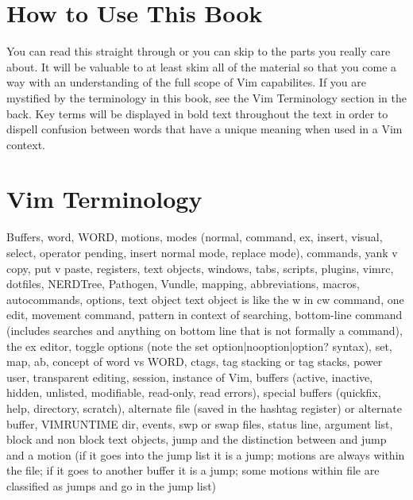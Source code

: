 \documentclass[12pt]{book}
\begin{document}
\section{How to Use This Book}
You can read this straight through or you can skip to the parts you really care about.
It will be valuable to at least skim all of the material so that you come a way with an understanding of the full scope of Vim capabilites.
If you are mystified by the terminology in this book, see the Vim Terminology section in the back.
Key terms will be displayed in bold text throughout the text in order to dispell confusion between words that have a unique meaning when used in a Vim context.

\section{Vim Terminology}
Buffers, word, WORD, motions, modes (normal, command, ex, insert, visual, select, operator pending, insert normal mode, replace mode), commands, yank v copy, put v paste, registers, text objects, windows, tabs, scripts, plugins, vimrc, dotfiles,
NERDTree, Pathogen, Vundle, mapping, abbreviations, macros, autocommands, options, text object text object is like the w in cw command, one edit, movement command, pattern in context of
searching, bottom-line command (includes searches and anything on bottom line that is not formally a command), the ex editor, toggle options (note the set option|nooption|option? syntax),
set, map, ab, concept of word vs WORD, ctags, tag stacking or tag stacks, power user, transparent editing, session, instance of Vim, buffers (active, inactive, hidden, unlisted, modifiable, read-only,
read errors), special buffers (quickfix, help, directory, scratch), alternate file (saved in the hashtag register) or alternate buffer, VIMRUNTIME dir, events, swp or swap files, status line,
argument list, block and non block text objects, jump and the distinction between and jump and a motion (if it goes into the jump list it is a jump; motions are always within the file; if it goes to
another buffer it is a jump; some motions within file are classified as jumps and go in the jump list)
\end{document}
